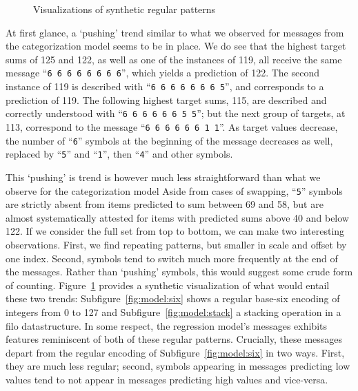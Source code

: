 \documentclass[twocolumn]{article}
\begin{document}
\begin{figure}
{
    }
    \caption{Visualizations of synthetic regular patterns}
    \label{fig:model}
\end{figure}


At first glance, a `pushing' trend similar to what we observed for messages from the categorization model seems to be in place.
We do see that the highest target sums of 125 and 122, as well as one of the instances of 119, all receive the same message ``\textcolor{Blues-K}{\tt 6~6~6~6~6~6~6~6}'', which yields a prediction of 122.
The second instance of 119 is described with ``{\tt \textcolor{Blues-K}{6~6~6~6~6~6~6}~\textcolor{Blues-I}{5}}'', and corresponds to a prediction of 119.
The following highest target sums, 115, are described and correctly understood with ``{\tt \textcolor{Blues-K}{6~6~6~6~6~6}~\textcolor{Blues-I}{5~5}}''; 
but the next group of targets, at 113, correspond to the message ``{\tt \textcolor{Blues-K}{6~6~6~6~6~6}~\textcolor{Blues-G}{1~1}}''.
As target values decrease, the number of ``\textcolor{Blues-K}{\tt 6}'' symbols at the beginning of the message decreases as well, replaced by ``\textcolor{Blues-I}{\tt 5}'' and ``\textcolor{Blues-G}{\tt 1}'', then ``\textcolor{Blues-F}{\tt 4}'' and other symbols.

This `pushing' is trend is however much less straightforward than what we observe for the categorization model
Aside from cases of swapping, ``\textcolor{Blues-I}{\tt 5}'' symbols are strictly absent from items predicted to sum between 69 and 58, but are almost systematically attested for items with predicted sums above 40 and below 122.
If we consider the full set from top to bottom, we can make two interesting observations.
First, we find repeating patterns, but smaller in scale and offset by one index.
Second, symbols tend to switch much more frequently at the end of the messages. 
Rather than `pushing' symbols, this would suggest some crude form of counting.
Figure~\ref{fig:model} provides a synthetic visualization of what would entail these two trends:
Subfigure~\ref{fig:model:six} shows a regular base-six encoding of integers from 0 to 127 and Subfigure~\ref{fig:model:stack} a stacking operation in a {\sc filo} datastructure.
In some respect, the regression model's messages exhibits features reminiscent of both of these regular patterns.
Crucially, these messages depart from the regular encoding of Subfigure~\ref{fig:model:six} in two ways.
First, they are much less regular; second, symbols appearing in messages predicting low values tend to not appear in messages predicting high values and vice-versa.
\end{document}
